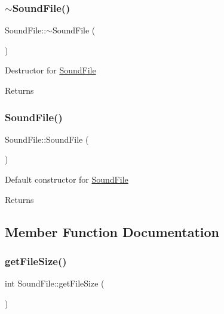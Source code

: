 \subsubsection{\texorpdfstring{$\sim$\+Sound\+File()}{~SoundFile()}}
{\footnotesize\ttfamily Sound\+File\+::$\sim$\+Sound\+File (\begin{DoxyParamCaption}{ }\end{DoxyParamCaption})}

Destructor for \hyperlink{classSoundFile}{Sound\+File} \begin{DoxyReturn}{Returns}

\end{DoxyReturn}
\mbox{\label{classSoundFile_a6b4a3ffaf85f0f60b8c311185ea8bd58}} 
\subsubsection{\texorpdfstring{Sound\+File()}{SoundFile()}\hspace{0.1cm}{\footnotesize\ttfamily [2/2]}}
{\footnotesize\ttfamily Sound\+File\+::\+Sound\+File (\begin{DoxyParamCaption}{ }\end{DoxyParamCaption})}

Default constructor for \hyperlink{classSoundFile}{Sound\+File} \begin{DoxyReturn}{Returns}

\end{DoxyReturn}


\subsection{Member Function Documentation}
\mbox{\label{classSoundFile_a0455dae80379afda92f2900a74b4f44a}} 
\subsubsection{\texorpdfstring{get\+File\+Size()}{getFileSize()}}
{\footnotesize\ttfamily int Sound\+File\+::get\+File\+Size (\begin{DoxyParamCaption}{ }\end{DoxyParamCaption})\hspace{0.3cm}{\ttfamily [protected]}}

